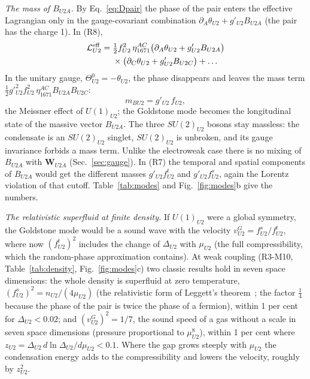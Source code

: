 \emph{The mass of $B_{U2A}$.} By Eq.~\eqref{eq:Dpair} the phase of the pair enters the effective
Lagrangian only in the gauge-covariant combination $\partial_A\theta_{U2}+g'_{U2}B_{U2A}$ (the pair has the
charge 1). In (R8),
\begin{equation}
\begin{aligned}
\mathcal L^{\rm eff}_{U2}={}&\tfrac12f^2_{U2}\,\eta^{AC}_{1671}\big(\partial_A\theta_{U2}+g'_{U2}B_{U2A}\big)\\
&\times\big(\partial_C\theta_{U2}+g'_{U2}B_{U2C}\big)+\dots
\end{aligned}
\label{eq:Leff}
\end{equation}
In the unitary gauge, $\Theta^0_{U2}=-\theta_{U2}$, the phase disappears and leaves the mass term
$\tfrac12g'^2_{U2}f^2_{U2}\,\eta^{AC}_{1671}B_{U2A}B_{U2C}$:
\begin{equation}
m_{BU2}=g'_{U2}\,f_{U2},
\label{eq:mB}
\end{equation}
the Meissner effect of $U(1)_{U2}$; the Goldstone mode becomes the longitudinal state of the massive
vector $B_{U2A}$. The three $SU(2)_{U2}$ bosons stay massless: the condensate is an $SU(2)_{U2}$
singlet, $SU(2)_{U2}$ is unbroken, and its gauge invariance forbids a mass term. Unlike the electroweak
case there is no mixing of $B_{U2A}$ with $\boldsymbol W_{U2A}$ (Sec.~\ref{sec:gauge}). In (R7) the
temporal and spatial components of $B_{U2A}$ would get the different masses $g'_{U2}f^t_{U2}$ and
$g'_{U2}f^s_{U2}$, again the Lorentz violation of that cutoff. Table~\ref{tab:modes} and
Fig.~\ref{fig:modes}b give the numbers.

\emph{The relativistic superfluid at finite density.} If $U(1)_{U2}$ were a global symmetry, the
Goldstone mode would be a sound wave with the velocity $v^G_{U2}=f^s_{U2}/f^t_{U2}$, where now
$(f^t_{U2})^2$ includes the change of $\Delta_{U2}$ with $\mu_{U2}$ (the full compressibility, which the
random-phase approximation contains). At weak coupling (R3-M10, Table~\ref{tab:density},
Fig.~\ref{fig:modes}c) two classic results hold in seven space dimensions: the whole density is
superfluid at zero temperature, $(f^s_{U2})^2=n_{U2}/(4\mu_{U2})$ (the relativistic form of Leggett's
theorem~\cite{Leggett1998,Son2002}; the factor $\tfrac14$ because the phase of the pair is twice
the phase of a fermion), within 1 per cent for $\Delta_{U2}<0.02$; and $(v^G_{U2})^2=1/7$, the sound
speed of a gas without a scale in seven space dimensions (pressure proportional to $\mu^8_{U2}$), within
1 per cent where $z_{U2}=\Delta_{U2}\,d\ln\Delta_{U2}/d\mu_{U2}<0.1$. Where the gap grows steeply with
$\mu_{U2}$ the condensation energy adds to the compressibility and lowers the velocity, roughly by
$z_{U2}^2$.

